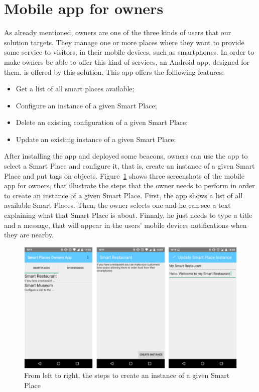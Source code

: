 \section{Mobile app for owners}
\label{sec:solution_mobile_app_for_owners}
As already mentioned, owners are one of the three kinds of users that our solution targets.
They manage one or more places where they want to provide some service to visitors, in their mobile devices, such as smartphones.
In order to make owners be able to offer this kind of services, an Android app, designed for them, is offered by this solution.
This app offers the folllowing features:
\begin{itemize}
  \item Get a list of all smart places available;
  \item Configure an instance of a given Smart Place;
  \item Delete an existing configuration of a given Smart Place;
  \item Update an existing instance of a given Smart Place;
\end{itemize}

After installing the app and deployed some beacons, owners can use the app to select a Smart Place and configure it, that is, create an instance of a given Smart Place and put tags on objects. Figure~\ref{fig:screenshot_ownersapp} shows three screenshots of the mobile app for owners, that illustrate the steps that the owner needs to perform in order to create an instance of a given Smart Place.
First, the app shows a list of all available Smart Places.
Then, the owner selects one and he can see a text explaining what that Smart Place is about.
Finnaly, he just needs to type a title and a message, that will appear in the users' mobile devices notifications when they are nearby.

\begin{figure}[!ht]
  \centering
    \includegraphics[width=1\textwidth, keepaspectratio]{images/screenshots/ownersapp}
    \caption[Create a Smart Place Instance]{From left to right, the steps to create an instance of a given Smart Place}
    \label{fig:screenshot_ownersapp}
\end{figure}


